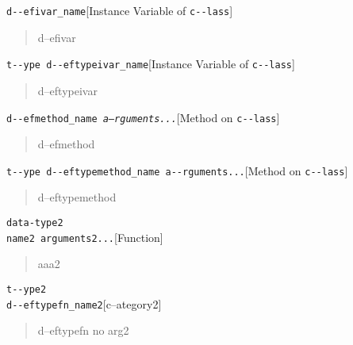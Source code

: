 \documentclass{book}
\begin{document}
\noindent\texttt{d{-}{-}efivar\_name}\hfill[Instance Variable of \texttt{c{-}{-}lass}]



%
\begin{quote}
\unskip{\parskip=0pt\noindent}%
d--efivar
\end{quote}

\noindent\texttt{t{-}{-}ype d{-}{-}eftypeivar\_name}\hfill[Instance Variable of \texttt{c{-}{-}lass}]



%
\begin{quote}
\unskip{\parskip=0pt\noindent}%
d--eftypeivar
\end{quote}

\noindent\texttt{d{-}{-}efmethod\_name \EmbracOn{}\textnormal{\textsl{a--rguments...}}\EmbracOff{}}\hfill[Method on \texttt{c{-}{-}lass}]



%
\begin{quote}
\unskip{\parskip=0pt\noindent}%
d--efmethod
\end{quote}

\noindent\texttt{t{-}{-}ype d{-}{-}eftypemethod\_name a{-}{-}rguments...}\hfill[Method on \texttt{c{-}{-}lass}]



%
\begin{quote}
\unskip{\parskip=0pt\noindent}%
d--eftypemethod
\end{quote}


\noindent\texttt{data-type2\leavevmode{}\\name2 arguments2...}\hfill[Function]



%
\begin{quote}
\unskip{\parskip=0pt\noindent}%
aaa2
\end{quote}

\noindent\texttt{t{-}{-}ype2\leavevmode{}\\d{-}{-}eftypefn\_name2}\hfill[c--ategory2]



%
\begin{quote}
\unskip{\parskip=0pt\noindent}%
d--eftypefn no arg2
\end{quote}
\end{document}
